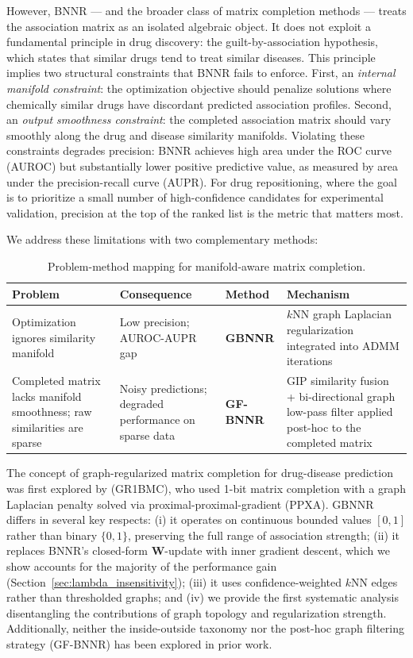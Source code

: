 \documentclass[unnumsec,webpdf,contemporary,large]{oup-authoring-template}
\begin{document}
However, BNNR --- and the broader class of matrix completion methods --- treats the association matrix as an isolated algebraic object. It does not exploit a fundamental principle in drug discovery: the guilt-by-association hypothesis, which states that similar drugs tend to treat similar diseases. This principle implies two structural constraints that BNNR fails to enforce. First, an \textit{internal manifold constraint}: the optimization objective should penalize solutions where chemically similar drugs have discordant predicted association profiles. Second, an \textit{output smoothness constraint}: the completed association matrix should vary smoothly along the drug and disease similarity manifolds. Violating these constraints degrades precision: BNNR achieves high area under the ROC curve (AUROC) but substantially lower positive predictive value, as measured by area under the precision-recall curve (AUPR). For drug repositioning, where the goal is to prioritize a small number of high-confidence candidates for experimental validation, precision at the top of the ranked list is the metric that matters most.

We address these limitations with two complementary methods:

\begin{table}[t]
\centering
\caption{Problem-method mapping for manifold-aware matrix completion.}
\label{tab:problem_method}
\begin{tabular}{p{3.2cm} p{3.2cm} p{3cm} p{4.5cm}}
\toprule
Problem & Consequence & Method & Mechanism \\
\midrule
Optimization ignores similarity manifold &
  Low precision; AUROC-AUPR gap &
  \textbf{GBNNR} &
  $k$NN graph Laplacian regularization integrated into ADMM iterations \\[4pt]
Completed matrix lacks manifold smoothness; raw similarities are sparse &
  Noisy predictions; degraded performance on sparse data &
  \textbf{GF-BNNR} &
  GIP similarity fusion + bi-directional graph low-pass filter applied post-hoc to the completed matrix \\
\bottomrule
\end{tabular}
\end{table}

The concept of graph-regularized matrix completion for drug-disease prediction was first explored by \citet{mongia2022} (GR1BMC), who used 1-bit matrix completion with a graph Laplacian penalty solved via proximal-proximal-gradient (PPXA). GBNNR differs in several key respects: (i) it operates on continuous bounded values $[0,1]$ rather than binary $\{0,1\}$, preserving the full range of association strength; (ii) it replaces BNNR's closed-form $\mathbf{W}$-update with inner gradient descent, which we show accounts for the majority of the performance gain (Section~\ref{sec:lambda_insensitivity}); (iii) it uses confidence-weighted $k$NN edges rather than thresholded graphs; and (iv) we provide the first systematic analysis disentangling the contributions of graph topology and regularization strength. Additionally, neither the inside-outside taxonomy nor the post-hoc graph filtering strategy (GF-BNNR) has been explored in prior work.
\end{document}
